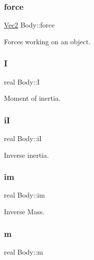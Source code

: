 \subsubsection{\texorpdfstring{force}{force}}
{\footnotesize\ttfamily \mbox{\hyperlink{struct_vec2}{Vec2}} Body\+::force}



Forces working on an object. 

\mbox{\label{struct_body_a48ced797496c1cd5bf4175cfc16c2364}} 
\subsubsection{\texorpdfstring{I}{I}}
{\footnotesize\ttfamily real Body\+::I}



Moment of inertia. 

\mbox{\label{struct_body_abab39f15217fc548e93a27eeda630c20}} 
\subsubsection{\texorpdfstring{iI}{iI}}
{\footnotesize\ttfamily real Body\+::iI}



Inverse inertia. 

\mbox{\label{struct_body_a500c28fac5382a812430a095f35d355f}} 
\subsubsection{\texorpdfstring{im}{im}}
{\footnotesize\ttfamily real Body\+::im}



Inverse Mass. 

\mbox{\label{struct_body_abbf210246f192562bf8809f2b2c3e238}} 
\subsubsection{\texorpdfstring{m}{m}}
{\footnotesize\ttfamily real Body\+::m}



